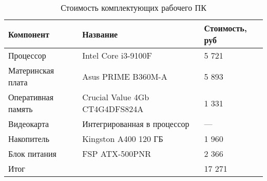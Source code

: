 \begin{table}[t]
    \centering
    \caption{Стоимость комплектующих рабочего ПК}
    \label{tab:pc_price}
    \begin{tabu}to \linewidth{X[m]X[2.2,c,m]X[r,m]}
        \toprule
        Компонент & Название & Стоимость, руб \\
        \midrule
        Процессор          & Intel Core i3-9100F            & 5 721 \\
        Материнская плата  & Asus PRIME B360M-A             & 5 893 \\
        Оперативная память & Crucial Value 4Gb CT4G4DFS824A & 1 331 \\
        Видеокарта         & Интегрированная в процессор    & —     \\
        Накопитель         & Kingston A400 120 ГБ           & 1 960 \\
        Блок питания       & FSP ATX-500PNR                 & 2 366 \\
        \midrule
        Итог & & 17 271 \\
        \bottomrule
    \end{tabu}
\end{table}

